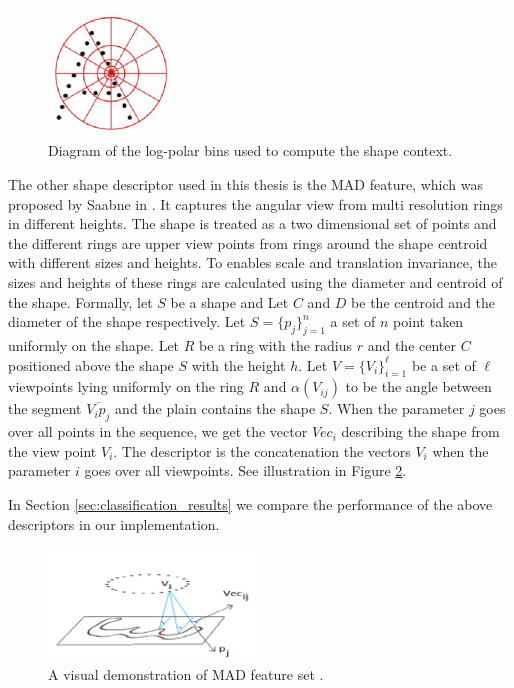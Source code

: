 \begin{figure}
\centering
\includegraphics[width=0.3\textwidth]{./figures/shape_context_online}   
\caption{Diagram of the log-polar bins used to compute the shape context.}
\label{fig:shape_context_demo}
\end{figure}

\iftoggle{edit-mode}{\hspace{0pt}\marginpar{MAD}}{}
The other shape descriptor used in this thesis is the MAD feature, which was proposed by Saabne in \cite{saabni2013multi}. 
It captures the angular view from multi resolution rings in different heights. 
The shape is treated as a two dimensional set of points and the different rings are upper view points from rings around the shape centroid with different sizes and heights. 
To enables scale and translation invariance, the sizes and heights of these rings are calculated using the diameter and centroid of the shape.
Formally, let $S$ be a shape and Let $C$ and $D$ be the centroid and the diameter of the shape respectively. 
Let $S = \{p_j\}_{j = 1}^n$ a set of $n$ point taken uniformly on the shape. 
Let $R$ be a ring with the radius $r$ and the center $C$ positioned above the shape $S$ with the height $h$. 
Let $V = \{V_i\}_{i = 1}^\ell$ be a set of $\ell$ viewpoints lying uniformly on the ring $R$ and $\alpha(V_{ij})$ to be the angle between the segment $\overline {{V_i}{p_j}}$ and the plain contains the shape $S$. 
When the parameter $j$ goes over all points in the sequence, we get the vector $Vec_i$ describing the shape from the view point $V_i$.
The descriptor is the concatenation the vectors $V_i$ when the parameter $i$ goes over all viewpoints. 
See illustration in Figure \ref{fig:mad_demo}.

In Section \ref{sec:classification_results} we compare the performance of the above descriptors in our implementation. 

\begin{figure}
\centering
\includegraphics[width=0.5\textwidth]{./figures/mad_demo}       
\caption{A visual demonstration of MAD feature set \cite{saabni2013multi}.}
\label{fig:mad_demo}
\end{figure}

